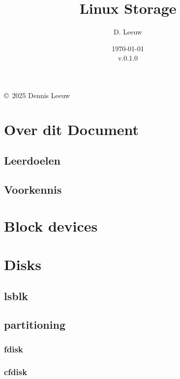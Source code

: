 \documentclass[a4paper,12pt,twoside,openright,titlepage]{book}
\author{D. Leeuw}
\title{Linux Storage}
\date{\today\\v.0.1.0}
\begin{document}

\maketitle

\copyright\ 2025 Dennis Leeuw\\




\frontmatter
\chapter{Over dit Document}
\section{Leerdoelen}

\section{Voorkennis}


\tableofcontents

\mainmatter

\chapter{Block devices}


\chapter{Disks}

\section{lsblk}

\section{partitioning}

\subsection{fdisk}

\subsection{cfdisk}

\end{document}
